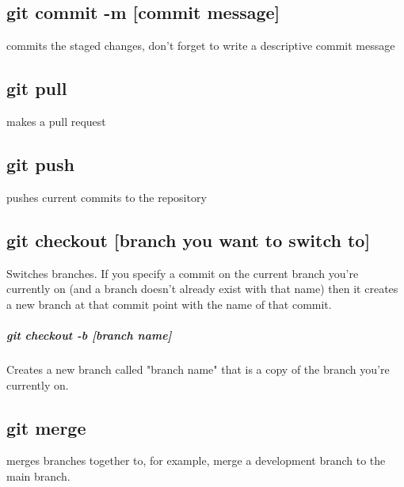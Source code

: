 \documentclass{article}
\begin{document}
\subsection{git commit -m [commit message]}
commits the staged changes, don't forget to write a descriptive commit message
\subsection{git pull}
makes a pull request
\subsection{git push}
pushes current commits to the repository
\subsection{git checkout [branch you want to switch to]}
Switches branches. If you specify a commit on the current branch you're currently on (and a branch doesn't already exist with that name) then it creates a new branch at that commit point with the name of that commit.
	\subparagraph{git checkout -b [branch name]}
	Creates a new branch called "branch name" that is a copy of the branch you're currently on.
\subsection{git merge}
merges branches together to, for example, merge a development branch to the main branch.
\end{document}
